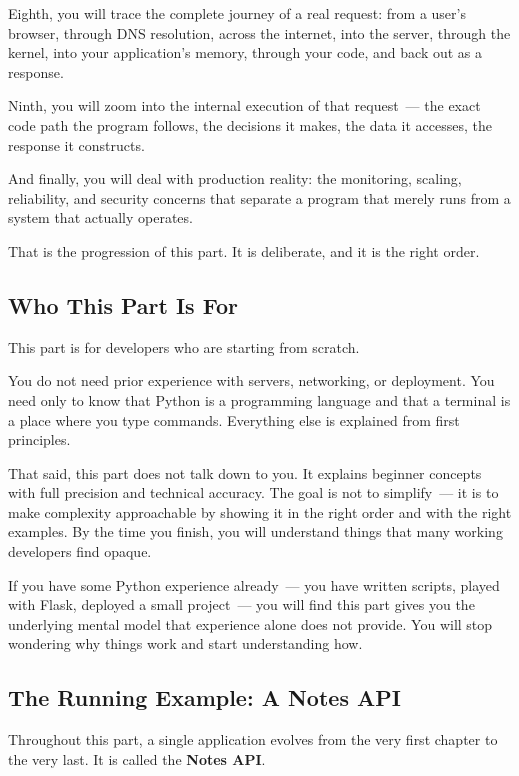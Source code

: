 Eighth, you will trace the complete journey of a real request: from a user's browser, through DNS resolution, across the internet, into the server, through the kernel, into your application's memory, through your code, and back out as a response.

Ninth, you will zoom into the internal execution of that request~--- the exact code path the program follows, the decisions it makes, the data it accesses, the response it constructs.

And finally, you will deal with production reality: the monitoring, scaling, reliability, and security concerns that separate a program that merely runs from a system that actually operates.

That is the progression of this part. It is deliberate, and it is the right order.

\subsection*{Who This Part Is For}\label{part4-introduction:who-this-part-is-for}

This part is for developers who are starting from scratch.

You do not need prior experience with servers, networking, or deployment. You need only to know that Python is a programming language and that a terminal is a place where you type commands. Everything else is explained from first principles.

That said, this part does not talk down to you. It explains beginner concepts with full precision and technical accuracy. The goal is not to simplify~--- it is to make complexity approachable by showing it in the right order and with the right examples. By the time you finish, you will understand things that many working developers find opaque.

If you have some Python experience already~--- you have written scripts, played with Flask, deployed a small project~--- you will find this part gives you the underlying mental model that experience alone does not provide. You will stop wondering why things work and start understanding how.

\subsection*{The Running Example: A Notes API}\label{part4-introduction:the-running-example-a-notes-api}

Throughout this part, a single application evolves from the very first chapter to the very last. It is called the \textbf{Notes API}.

